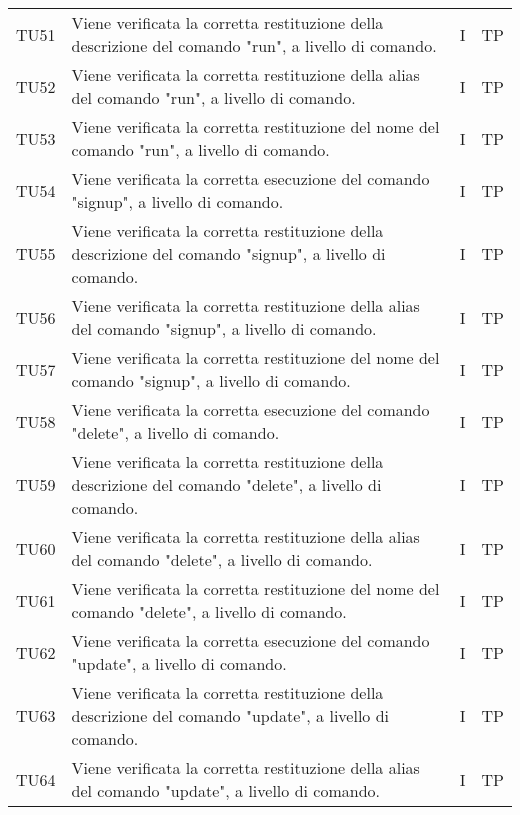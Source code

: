 \begin{longtable}{|C{1.5cm}|C{8cm}|C{3cm}|C{1cm}|}
	TU51 &
	Viene verificata la corretta restituzione della descrizione del comando "run", a livello di comando.  &
	I & TP\\

	TU52 &
	Viene verificata la corretta restituzione della alias del comando "run", a livello di comando.  &
	I & TP\\

	TU53 &
	Viene verificata la corretta restituzione del nome del comando "run", a livello di comando.  &
	I & TP\\

	TU54 &
	Viene verificata la corretta esecuzione del comando "signup", a livello di comando.  &
	I & TP\\

	TU55 &
	Viene verificata la corretta restituzione della descrizione del comando "signup", a livello di comando.  &
	I & TP\\

	TU56 &
	Viene verificata la corretta restituzione della alias del comando "signup", a livello di comando.  &
	I & TP\\

	TU57 &
	Viene verificata la corretta restituzione del nome del comando "signup", a livello di comando.  &
	I & TP\\

	TU58 &
	Viene verificata la corretta esecuzione del comando "delete", a livello di comando.  &
	I & TP\\

	TU59 &
	Viene verificata la corretta restituzione della descrizione del comando "delete", a livello di comando.  &
	I & TP\\

	TU60 &
	Viene verificata la corretta restituzione della alias del comando "delete", a livello di comando.  &
	I & TP\\

	TU61 &
	Viene verificata la corretta restituzione del nome del comando "delete", a livello di comando.  &
	I & TP\\

	TU62 &
	Viene verificata la corretta esecuzione del comando "update", a livello di comando.  &
	I & TP\\

	TU63 &
	Viene verificata la corretta restituzione della descrizione del comando "update", a livello di comando.  &
	I & TP\\

	TU64 &
	Viene verificata la corretta restituzione della alias del comando "update", a livello di comando.  &
	I & TP\\


\end{longtable}
